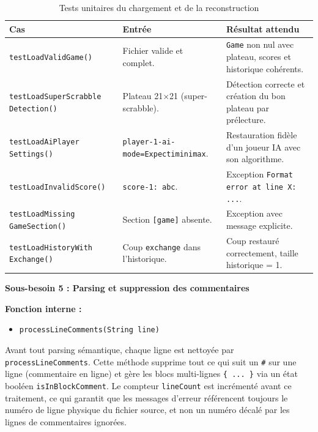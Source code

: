 \documentclass[a4paper]{article}
\begin{document}
\begin{table}[H]
    \centering
    \small
    \begin{tabular}{p{4.5cm} p{4.5cm} p{5.5cm}}
        \toprule
        \textbf{Cas} & \textbf{Entrée} & \textbf{Résultat attendu} \\
        \midrule
        \texttt{testLoadValidGame()} & Fichier valide et complet. & \texttt{Game} non nul avec plateau, scores et historique cohérents. \\
        \midrule
        \texttt{testLoadSuperScrabble Detection()} & Plateau 21$\times$21 (super-scrabble). & Détection correcte et création du bon plateau par prélecture. \\
        \midrule
        \texttt{testLoadAiPlayer Settings()} & \texttt{player-1-ai-mode=Expectiminimax}. & Restauration fidèle d'un joueur IA avec son algorithme. \\
        \midrule
        \texttt{testLoadInvalidScore()} & \texttt{score-1: abc}. & Exception \texttt{Format error at line X: ...}. \\
        \midrule
        \texttt{testLoadMissing GameSection()} & Section \texttt{[game]} absente. & Exception avec message explicite. \\
        \midrule
        \texttt{testLoadHistoryWith Exchange()} & Coup \texttt{exchange} dans l'historique. & Coup restauré correctement, taille historique = 1. \\
        \bottomrule
    \end{tabular}
    \caption{Tests unitaires du chargement et de la reconstruction}
\end{table}

\begin{besoinbox}
    \textbf{\large Sous-besoin 5 : Parsing et suppression des commentaires}

    \vspace{2mm}
    \textbf{Fonction interne :}
    \begin{itemize}
        \item \texttt{processLineComments(String line)}
    \end{itemize}
    \vspace{2mm}

    Avant tout parsing sémantique, chaque ligne est nettoyée par \texttt{processLineComments}. Cette méthode supprime tout ce qui suit un \texttt{\#} sur une ligne (commentaire en ligne) et gère les blocs multi-lignes \texttt{\{ ... \}} via un état booléen \texttt{isInBlockComment}. Le compteur \texttt{lineCount} est incrémenté avant ce traitement, ce qui garantit que les messages d'erreur référencent toujours le numéro de ligne physique du fichier source, et non un numéro décalé par les lignes de commentaires ignorées.
\end{besoinbox}
\end{document}
